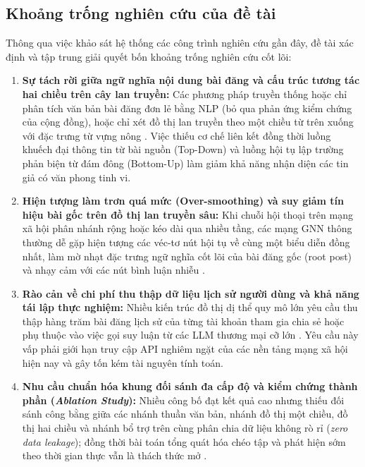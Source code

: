 \documentclass[11pt,a4paper]{extreport}
\begin{document}
\subsection{Khoảng trống nghiên cứu của đề tài}
Thông qua việc khảo sát hệ thống các công trình nghiên cứu gần đây, đề tài xác định và tập trung giải quyết bốn khoảng trống nghiên cứu cốt lõi:
\begin{enumerate}
    \item \textbf{Sự tách rời giữa ngữ nghĩa nội dung bài đăng và cấu trúc tương tác hai chiều trên cây lan truyền:} Các phương pháp truyền thống hoặc chỉ phân tích văn bản bài đăng đơn lẻ bằng NLP (bỏ qua phản ứng kiểm chứng của cộng đồng), hoặc chỉ xét đồ thị lan truyền theo một chiều từ trên xuống với đặc trưng từ vựng nông \cite{noauthor_comparative_2024, noauthor_early_2025}. Việc thiếu cơ chế liên kết đồng thời luồng khuếch đại thông tin từ bài nguồn (Top-Down) và luồng hội tụ lập trường phản biện từ đám đông (Bottom-Up) làm giảm khả năng nhận diện các tin giả có văn phong tinh vi.
    \item \textbf{Hiện tượng làm trơn quá mức (Over-smoothing) và suy giảm tín hiệu bài gốc trên đồ thị lan truyền sâu:} Khi chuỗi hội thoại trên mạng xã hội phân nhánh rộng hoặc kéo dài qua nhiều tầng, các mạng GNN thông thường dễ gặp hiện tượng các véc-tơ nút hội tụ về cùng một biểu diễn đồng nhất, làm mờ nhạt đặc trưng ngữ nghĩa cốt lõi của bài đăng gốc (root post) và nhạy cảm với các nút bình luận nhiễu \cite{noauthor_fake_2023, noauthor_exploiting_2024, noauthor_integrating_2025}.
    \item \textbf{Rào cản về chi phí thu thập dữ liệu lịch sử người dùng và khả năng tái lập thực nghiệm:} Nhiều kiến trúc đồ thị dị thể quy mô lớn yêu cầu thu thập hàng trăm bài đăng lịch sử của từng tài khoản tham gia chia sẻ hoặc phụ thuộc vào việc gọi suy luận từ các LLM thương mại cỡ lớn \cite{noauthor_co-attention_2025, noauthor_llm-based_2025}. Yêu cầu này vấp phải giới hạn truy cập API nghiêm ngặt của các nền tảng mạng xã hội hiện nay và gây tốn kém tài nguyên tính toán.
    \item \textbf{Nhu cầu chuẩn hóa khung đối sánh đa cấp độ và kiểm chứng thành phần (\textit{Ablation Study}):} Nhiều công bố đạt kết quả cao nhưng thiếu đối sánh công bằng giữa các nhánh thuần văn bản, nhánh đồ thị một chiều, đồ thị hai chiều và nhánh bổ trợ trên cùng phân chia dữ liệu không rò rỉ (\textit{zero data leakage}); đồng thời bài toán tổng quát hóa chéo tập và phát hiện sớm theo thời gian thực vẫn là thách thức mở \cite{noauthor_early_2025, noauthor_improving_2025, tao_out--distribution_2024}.
\end{enumerate}
\end{document}
